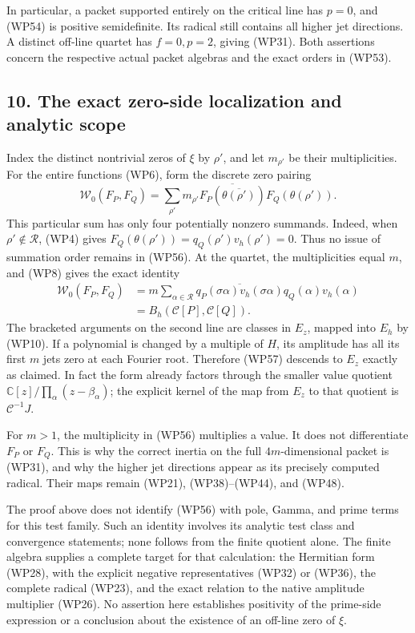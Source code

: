 \documentclass[
  10pt,
  a4paper,
]{article}
\newcounter{none} %
\begin{document}
In particular, a packet supported entirely on the critical line has
\(p=0\), and (WP54) is positive semidefinite. Its radical still contains
all higher jet directions. A distinct off-line quartet has \(f=0,p=2\),
giving (WP31). Both assertions concern the respective actual packet
algebras and the exact orders in (WP53).

\subsection{10. The exact zero-side localization and analytic
scope}\label{the-exact-zero-side-localization-and-analytic-scope}

Index the distinct nontrivial zeros of \(\xi\) by \(\rho'\), and let
\(m_{\rho'}\) be their multiplicities. For the entire functions (WP6),
form the discrete zero pairing \[
\mathscr W_0(F_P,F_Q)
=\sum_{\rho'}m_{\rho'}
\overline{F_P(\overline{\theta(\rho')})}
F_Q(\theta(\rho')).
\tag{WP56}
\] This particular sum has only four potentially nonzero summands.
Indeed, when \(\rho'\notin\mathcal R\), (WP4) gives
\(F_Q(\theta(\rho'))=q_Q(\rho')v_h(\rho')=0\). Thus no issue of
summation order remains in (WP56). At the quartet, the multiplicities
equal \(m\), and (WP8) gives the exact identity \[
\begin{aligned}
\mathscr W_0(F_P,F_Q)
&=m\sum_{\alpha\in\mathcal R}
\overline{q_P(\sigma\alpha)v_h(\sigma\alpha)}
q_Q(\alpha)v_h(\alpha)\\
&=B_h(\mathcal C[P],\mathcal C[Q]).
\end{aligned}
\tag{WP57}
\] The bracketed arguments on the second line are classes in \(E_z\),
mapped into \(E_h\) by (WP10). If a polynomial is changed by a multiple
of \(H\), its amplitude has all its first \(m\) jets zero at each
Fourier root. Therefore (WP57) descends to \(E_z\) exactly as claimed.
In fact the form already factors through the smaller value quotient
\(\mathbb C[z]/\prod_\alpha(z-\beta_\alpha)\); the explicit kernel of
the map from \(E_z\) to that quotient is \(\mathcal C^{-1}J\).

For \(m>1\), the multiplicity in (WP56) multiplies a value. It does not
differentiate \(F_P\) or \(F_Q\). This is why the correct inertia on the
full \(4m\)-dimensional packet is (WP31), and why the higher jet
directions appear as its precisely computed radical. Their maps remain
(WP21), (WP38)--(WP44), and (WP48).

The proof above does not identify (WP56) with pole, Gamma, and prime
terms for this test family. Such an identity involves its analytic test
class and convergence statements; none follows from the finite quotient
alone. The finite algebra supplies a complete target for that
calculation: the Hermitian form (WP28), with the explicit negative
representatives (WP32) or (WP36), the complete radical (WP23), and the
exact relation to the native amplitude multiplier (WP26). No assertion
here establishes positivity of the prime-side expression or a conclusion
about the existence of an off-line zero of \(\xi\).
\end{document}
